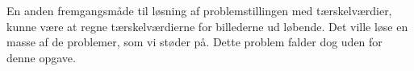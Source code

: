 En anden fremgangsmåde til løsning af problemstillingen med tærskelværdier, kunne
være at regne tærskelværdierne for billederne ud løbende. Det ville
løse en masse af de problemer, som vi støder på. Dette problem falder dog 
uden for denne opgave.

